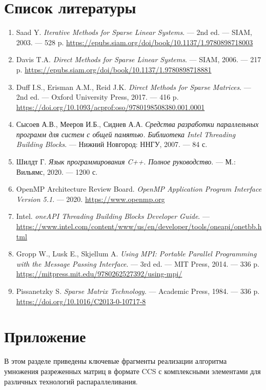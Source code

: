 \documentclass[12pt]{extarticle}
\begin{document}
\section{Список литературы}
\begin{enumerate}
    \item Saad Y. \textit{Iterative Methods for Sparse Linear Systems}. — 2nd ed. — SIAM, 2003. — 528 p. \url{https://epubs.siam.org/doi/book/10.1137/1.9780898718003}
    \item Davis T.A. \textit{Direct Methods for Sparse Linear Systems}. — SIAM, 2006. — 217 p. \url{https://epubs.siam.org/doi/book/10.1137/1.9780898718881}
    \item Duff I.S., Erisman A.M., Reid J.K. \textit{Direct Methods for Sparse Matrices}. — 2nd ed. — Oxford University Press, 2017. — 416 p. \url{https://doi.org/10.1093/acprof:oso/9780198508380.001.0001}
    \item Сысоев А.В., Мееров И.Б., Сиднев А.А. \textit{Средства разработки параллельных программ для систем с общей памятью. Библиотека Intel Threading Building Blocks}. — Нижний Новгород: ННГУ, 2007. — 84 с.
    \item Шилдт Г. \textit{Язык программирования C++. Полное руководство}. — М.: Вильямс, 2020. — 1200 с.
    \item OpenMP Architecture Review Board. \textit{OpenMP Application Program Interface Version 5.1}. — 2020. \url{https://www.openmp.org}
    \item Intel. \textit{oneAPI Threading Building Blocks Developer Guide}. — \url{https://www.intel.com/content/www/us/en/developer/tools/oneapi/onetbb.html}
    \item Gropp W., Lusk E., Skjellum A. \textit{Using MPI: Portable Parallel Programming with the Message Passing Interface}. — 3rd ed. — MIT Press, 2014. — 336 p. \url{https://mitpress.mit.edu/9780262527392/using-mpi/}
    \item Pissanetzky S. \textit{Sparse Matrix Technology}. — Academic Press, 1984. — 336 p. \url{https://doi.org/10.1016/C2013-0-10717-8}
\end{enumerate}
\appendix
\newpage
\section*{Приложение}

\hspace*{1.25cm}В этом разделе приведены ключевые фрагменты реализации алгоритма умножения разреженных матриц в формате CCS с комплексными элементами для различных технологий распараллеливания.
\end{document}

